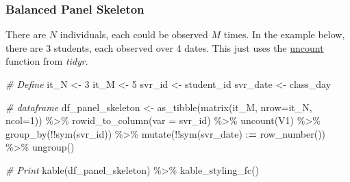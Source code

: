 \documentclass[
]{book}
\newenvironment{Shaded}{\begin{snugshade}}{\end{snugshade}}
\newcommand{\AttributeTok}[1]{\textcolor[rgb]{0.77,0.63,0.00}{#1}}
\newcommand{\CommentTok}[1]{\textcolor[rgb]{0.56,0.35,0.01}{\textit{#1}}}
\newcommand{\DecValTok}[1]{\textcolor[rgb]{0.00,0.00,0.81}{#1}}
\newcommand{\ErrorTok}[1]{\textcolor[rgb]{0.64,0.00,0.00}{\textbf{#1}}}
\newcommand{\FunctionTok}[1]{\textcolor[rgb]{0.00,0.00,0.00}{#1}}
\newcommand{\NormalTok}[1]{#1}
\newcommand{\OtherTok}[1]{\textcolor[rgb]{0.56,0.35,0.01}{#1}}
\newcommand{\SpecialCharTok}[1]{\textcolor[rgb]{0.00,0.00,0.00}{#1}}
\newcommand{\StringTok}[1]{\textcolor[rgb]{0.31,0.60,0.02}{#1}}
\begin{document}
\hypertarget{balanced-panel-skeleton}{%
\subsubsection{Balanced Panel Skeleton}\label{balanced-panel-skeleton}}

There are \(N\) individuals, each could be observed \(M\) times. In the example below, there are 3 students, each observed over 4 dates. This just uses the \href{https://tidyr.tidyverse.org/reference/uncount.html}{uncount} function from \emph{tidyr}.

\begin{Shaded}
\begin{Highlighting}[]
\CommentTok{\# Define}
\NormalTok{it\_N }\OtherTok{\textless{}{-}} \DecValTok{3}
\NormalTok{it\_M }\OtherTok{\textless{}{-}} \DecValTok{5}
\NormalTok{svr\_id }\OtherTok{\textless{}{-}} \StringTok{\textquotesingle{}student\_id\textquotesingle{}}
\NormalTok{svr\_date }\OtherTok{\textless{}{-}} \StringTok{\textquotesingle{}class\_day\textquotesingle{}}

\CommentTok{\# dataframe}
\NormalTok{df\_panel\_skeleton }\OtherTok{\textless{}{-}} \FunctionTok{as\_tibble}\NormalTok{(}\FunctionTok{matrix}\NormalTok{(it\_M, }\AttributeTok{nrow=}\NormalTok{it\_N, }\AttributeTok{ncol=}\DecValTok{1}\NormalTok{)) }\SpecialCharTok{\%\textgreater{}\%}
  \FunctionTok{rowid\_to\_column}\NormalTok{(}\AttributeTok{var =}\NormalTok{ svr\_id) }\SpecialCharTok{\%\textgreater{}\%}
  \FunctionTok{uncount}\NormalTok{(V1) }\SpecialCharTok{\%\textgreater{}\%}
  \FunctionTok{group\_by}\NormalTok{(}\SpecialCharTok{!!}\FunctionTok{sym}\NormalTok{(svr\_id)) }\SpecialCharTok{\%\textgreater{}\%} \FunctionTok{mutate}\NormalTok{(}\SpecialCharTok{!!}\FunctionTok{sym}\NormalTok{(svr\_date) }\SpecialCharTok{:}\ErrorTok{=} \FunctionTok{row\_number}\NormalTok{()) }\SpecialCharTok{\%\textgreater{}\%}
  \FunctionTok{ungroup}\NormalTok{()}

\CommentTok{\# Print}
\FunctionTok{kable}\NormalTok{(df\_panel\_skeleton) }\SpecialCharTok{\%\textgreater{}\%}
  \FunctionTok{kable\_styling\_fc}\NormalTok{()}
\end{Highlighting}
\end{Shaded}
\end{document}
